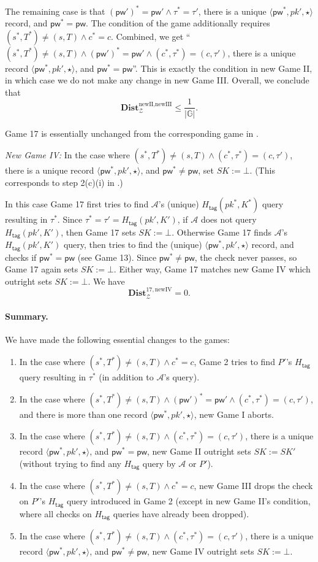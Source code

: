 \documentclass{article}
\theoremstyle{plain}
\theoremstyle{definition}
\theoremstyle{remark}
\newcommand{\group}{\mathbb{G}}
\newcommand{\adv}{\mathcal{A}}
\newcommand{\env}{\mathcal{Z}}
\newcommand{\Dist}{\mathbf{Dist}}
\newcommand{\Htag}{H_\mathsf{tag}}
\newcommand{\pw}{\mathsf{pw}}
\begin{document}
The remaining case is that $(\pw')^* = \pw' \land \tau^* = \tau'$, there is a unique $\langle\pw^*,pk',\star\rangle$ record, and $\pw^* = \pw$. The condition of the game additionally requires $(s^*,T^*) \neq (s,T) \land c^* = c$. Combined, we get ``$(s^*,T^*) \neq (s,T) \land (\pw')^* = \pw' \land (c^*,\tau^*) = (c,\tau')$, there is a unique record $\langle\pw^*,pk',\star\rangle$, and $\pw^* = \pw$''. This is exactly the condition in new Game II, in which case we do not make any change in new Game III. Overall, we conclude that
\[
\Dist_\env^{\text{newII},\text{newIII}} \leq \frac{1}{|\group|}.
\]

Game 17 is essentially unchanged from the corresponding game in .

\medskip\noindent\emph{New Game IV:} In the case where $(s^*,T^*) \neq (s,T) \land (c^*,\tau^*) = (c,\allowbreak\tau')$, there is a unique record $\langle\pw^*,pk',\star\rangle$, and $\pw^* \neq \pw$, set $SK := \bot$. (This corresponds to step 2(c)(i) in .)

In this case Game 17 first tries to find $\adv$'s (unique) $\Htag(pk^*,K^*)$ query resulting in $\tau^*$. Since $\tau^* = \tau' = \Htag(pk',K')$, if $\adv$ does not query $\Htag(pk',K')$, then Game 17 sets $SK := \bot$. Otherwise Game 17 finds $\adv$'s $\Htag(pk',K')$ query, then tries to find the (unique) $\langle\pw^*,pk',\star\rangle$ record, and checks if $\pw^* = \pw$ (see Game 13). Since $\pw^* \neq \pw$, the check never passes, so Game 17 again sets $SK := \bot$. Either way, Game 17 matches new Game IV which outright sets $SK := \bot$. We have
\[
\Dist_\env^{17,\text{newIV}} = 0.
\]

\paragraph{Summary.}
We have made the following essential changes to the games:
\begin{enumerate}
  \item In the case where $(s^*,T^*) \neq (s,T) \land c^* = c$, Game 2 tries to find $P'$'s $\Htag$ query resulting in $\tau^*$ (in addition to $\adv$'s query).
  \item In the case where $(s^*,T^*) \neq (s,T) \land (\pw')^* = \pw' \land (c^*,\tau^*) = (c,\tau')$, and there is more than one record $\langle\pw^*,pk',\star\rangle$, new Game I aborts.
  \item In the case where $(s^*,T^*) \neq (s,T) \land (c^*,\tau^*) = (c,\tau')$, there is a unique record $\langle\pw^*,pk',\star\rangle$, and $\pw^* = \pw$, new Game II outright sets $SK := SK'$ (without trying to find any $\Htag$ query by $\adv$ or $P'$).
  \item In the case where $(s^*,T^*) \neq (s,T) \land c^* = c$, new Game III drops the check on $P'$'s $\Htag$ query introduced in Game 2 (except in new Game II's condition, where all checks on $\Htag$ queries have already been dropped).
  \item In the case where $(s^*,T^*) \neq (s,T) \land (c^*,\tau^*) = (c,\tau')$, there is a unique record $\langle\pw^*,pk',\star\rangle$, and $\pw^* \neq \pw$, new Game IV outright sets $SK := \bot$.
\end{enumerate}
\end{document}

